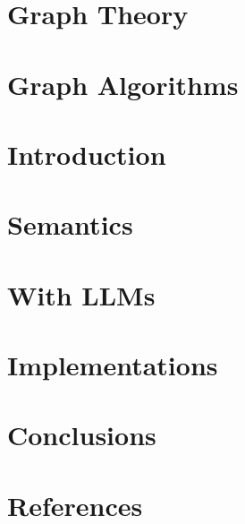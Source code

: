 \section[Theory]{Graph Theory}


\section[Algos]{Graph Algorithms}


\section[Intro]{Introduction}


\section[Sem]{Semantics}


\section[LLMs]{With LLMs}


\section[Impl]{Implementations}


\section[Conclusions]{Conclusions}


\section[Refs]{References}
